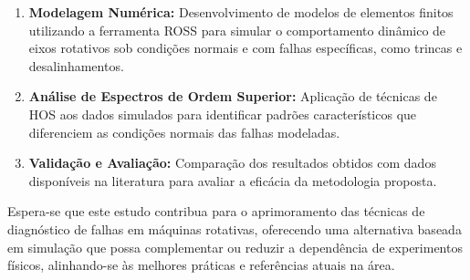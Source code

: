 \documentclass[12pt, a4paper]{article}
\begin{document}
\begin{enumerate}
\item \textbf{Modelagem Numérica:} Desenvolvimento de modelos de elementos finitos utilizando a ferramenta ROSS \citep{timbo_ross_2020} para simular o comportamento dinâmico de eixos rotativos sob condições normais e com falhas específicas, como trincas e desalinhamentos.

\item \textbf{Análise de Espectros de Ordem Superior:} Aplicação de técnicas de HOS aos dados simulados para identificar padrões característicos que diferenciem as condições normais das falhas modeladas.

\item \textbf{Validação e Avaliação:} Comparação dos resultados obtidos com dados disponíveis na literatura para avaliar a eficácia da metodologia proposta.
\end{enumerate}

Espera-se que este estudo contribua para o aprimoramento das técnicas de diagnóstico de falhas em máquinas rotativas, oferecendo uma alternativa baseada em simulação que possa complementar ou reduzir a dependência de experimentos físicos, alinhando-se às melhores práticas e referências atuais na área.



\end{document}
